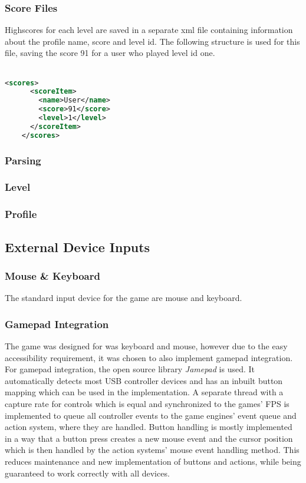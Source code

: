\subsubsection{Score Files}\label{subsubsec:score-files}
Highscores for each level are saved in a separate xml file containing information about the profile name, score and level id.
The following structure is used for this file, saving the score 91 for a user who played level id one.
\\ \\
\begin{lstlisting}[language=XML,label={lst:score-xml}]
    <scores>
      <scoreItem>
        <name>User</name>
        <score>91</score>
        <level>1</level>
      </scoreItem>
    </scores>
\end{lstlisting}

\subsubsection{Parsing}\label{subsubsec:parsing}

\subsubsection{Level}
\subsubsection{Profile}
\subsection{External Device Inputs}\label{subsec:external-device-inputs}
\subsubsection{Mouse \& Keyboard}\label{subsubsec:mouse-&-keyboard}
The standard input device for the game are mouse and keyboard.
\subsubsection{Gamepad Integration}\label{subsubsec:gamepad-integration}
The game was designed for was keyboard and mouse, however due to the easy accessibility requirement, it was chosen to also implement gamepad integration.
For gamepad integration, the open source library \textit{Jamepad} is used.
It automatically detects most USB controller devices and has an inbuilt button mapping which can be used in the implementation.
A separate thread with a capture rate for controls which is equal and synchronized to the games' FPS is implemented to queue all controller
events to the game engines' event queue and action system, where they are handled.
Button handling is mostly implemented in a way that a button press creates a new mouse event and the cursor position which is then handled by the action
systems' mouse event handling method.
This reduces maintenance and new implementation of buttons and actions, while being guaranteed to work correctly with all devices.


